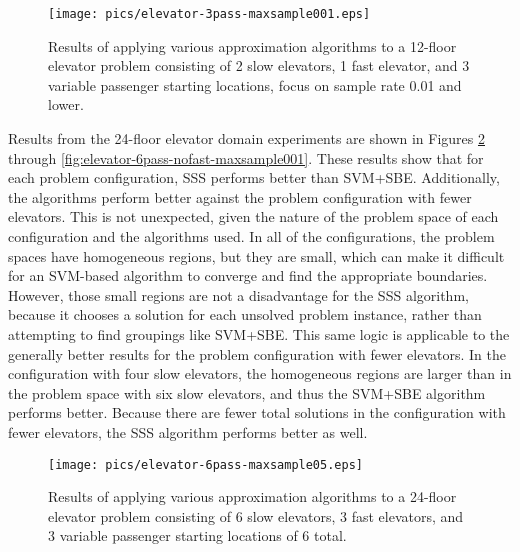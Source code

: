 \begin{figure}
\begin{center}
\texttt{[image: pics/elevator-3pass-maxsample001.eps]}
\caption{Results of applying various approximation algorithms to a 12-floor elevator problem consisting of 2 slow elevators, 1 fast elevator, and 3 variable passenger starting locations, focus on sample rate 0.01 and lower.}
\label{fig:elevator-3pass-maxsample001}
\end{center}
\end{figure}





Results from the 24-floor elevator domain experiments are shown in Figures \ref{fig:elevator-6pass-maxsample05} through \ref{fig:elevator-6pass-nofast-maxsample001}.  These results show that for each problem configuration, SSS performs better than SVM+SBE.  Additionally, the algorithms perform better against the problem configuration with fewer elevators.  This is not unexpected,  given the nature of the problem space of each configuration and the algorithms used.  In all of the configurations, the problem spaces have homogeneous regions, but they are small, which can make it difficult for an SVM-based algorithm to converge and find the appropriate boundaries.  However, those small regions are not a disadvantage for the SSS algorithm, because it chooses a solution for each unsolved problem instance, rather than attempting to find groupings like SVM+SBE.  This same logic is applicable to the generally better results for the problem configuration with fewer elevators.  In the  configuration with four slow elevators, the homogeneous regions are larger than in the  problem space with six slow elevators, and thus the SVM+SBE algorithm performs better.  Because there are fewer total solutions in the configuration with fewer elevators, the SSS algorithm performs better as well.





\begin{figure}
\begin{center}
\texttt{[image: pics/elevator-6pass-maxsample05.eps]}
\caption{Results of applying various approximation algorithms to a 24-floor elevator problem consisting of 6 slow elevators, 3 fast elevators, and 3 variable passenger starting locations of 6 total.}
\label{fig:elevator-6pass-maxsample05}
\end{center}
\end{figure}

